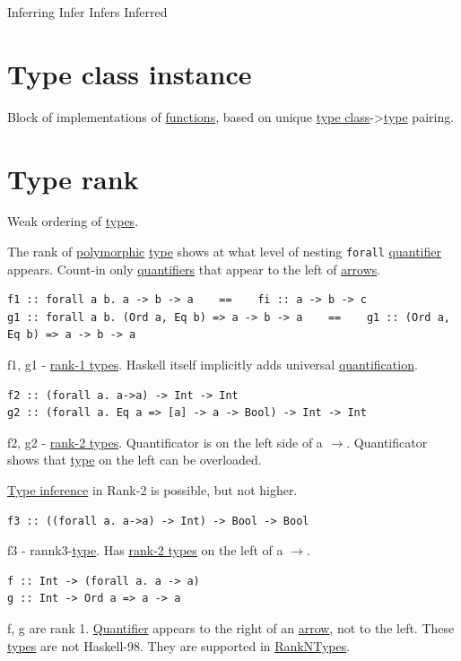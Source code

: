 \documentclass[a4paper,14pt,oneside]{book}
\begin{document}
\label{org5b8c057}Inferring
\label{orgb91f150}Infer
\label{org762866b}Infers
\label{org3ebc172}Inferred

\section{\label{orgf345504}Type class instance}
\label{sec:org2d0e6e6}
Block of implementations of \hyperref[org98c9592]{functions}, based on unique \hyperref[org4b105c4]{type class}->\hyperref[orgde40363]{type} pairing.

\section{\label{org276e16f}Type rank}
\label{sec:orga4dc1a9}
Weak ordering of \hyperref[org91cf53a]{types}.

The rank of \hyperref[org5b122e2]{polymorphic} \hyperref[orgde40363]{type} shows at what level of nesting \texttt{forall} \hyperref[org2ad57c0]{quantifier} appears.
Count-in only \hyperref[org32d2bad]{quantifiers} that appear to the left of \hyperref[org8dc36eb]{arrows}.
\begin{verbatim}
f1 :: forall a b. a -> b -> a    ==    fi :: a -> b -> c
g1 :: forall a b. (Ord a, Eq b) => a -> b -> a    ==    g1 :: (Ord a, Eq b) => a -> b -> a
\end{verbatim}
f1, g1 - \hyperref[org2929e83]{rank-1 types}. Haskell itself implicitly adds universal \hyperref[org3ba7cbd]{quantification}.

\begin{verbatim}
f2 :: (forall a. a->a) -> Int -> Int
g2 :: (forall a. Eq a => [a] -> a -> Bool) -> Int -> Int
\end{verbatim}
f2, g2 - \hyperref[orgd554325]{rank-2 types}. Quantificator is on the left side of a \(\to\). Quantificator shows that \hyperref[orgde40363]{type} on the left can be overloaded.

\hyperref[org9e4a9ba]{Type inference} in Rank-2 is possible, but not higher.

\begin{verbatim}
f3 :: ((forall a. a->a) -> Int) -> Bool -> Bool
\end{verbatim}
f3 - rannk3-\hyperref[orgde40363]{type}. Has \hyperref[orgd554325]{rank-2 types} on the left of a \(\to\).

\begin{verbatim}
f :: Int -> (forall a. a -> a)
g :: Int -> Ord a => a -> a
\end{verbatim}
f, g are rank 1. \hyperref[org2ad57c0]{Quantifier} appears to the right of an \hyperref[org0b51b24]{arrow}, not to the left. These \hyperref[org91cf53a]{types} are not Haskell-98. They are supported in \hyperref[org05334eb]{RankNTypes}.
\end{document}
